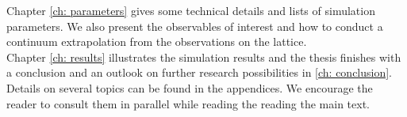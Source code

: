 %
Chapter \ref{ch: parameters} gives some technical details and lists of simulation parameters. We also present the observables of interest and how to conduct a continuum extrapolation from the observations on the lattice.\\
%
Chapter \ref{ch: results} illustrates the simulation results and the thesis finishes with a conclusion and an outlook on further research possibilities in \autoref{ch: conclusion}.\\
%
Details on several topics can be found in the appendices. We encourage the reader to consult them in parallel while reading the reading the main text.
